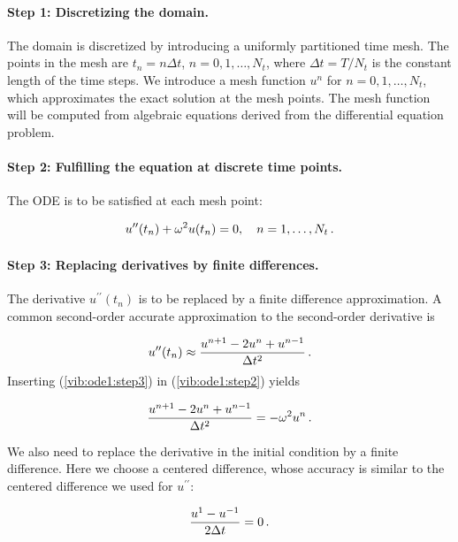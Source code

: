 \documentclass[%
oneside,                 %
final,                   %
10pt]{article}
\begin{document}
\paragraph{Step 1: Discretizing the domain.}
The domain is discretized by
introducing a uniformly partitioned time mesh.
The points in the mesh are $t_n=n\Delta t$, $n=0,1,\ldots,N_t$,
where $\Delta t = T/N_t$ is the constant length of the time steps.
We introduce a mesh function $u^n$ for $n=0,1,\ldots,N_t$, which
approximates the exact solution at the mesh points. The mesh
function will be computed from algebraic equations derived from
the differential equation problem.


\paragraph{Step 2: Fulfilling the equation at discrete time points.}
The ODE is to be satisfied at each mesh point:

\begin{equation}
u^{\prime\prime}(t_n) + \omega^2u(t_n) = 0,\quad n=1,\ldots,N_t
\tp
\label{vib:ode1:step2}
\end{equation}

 

\paragraph{Step 3: Replacing derivatives by finite differences.}
The derivative $u^{\prime\prime}(t_n)$ is to be replaced by a finite
difference approximation. A common second-order accurate approximation
to the second-order derivative is

\begin{equation}
u^{\prime\prime}(t_n) \approx \frac{u^{n+1}-2u^n + u^{n-1}}{\Delta t^2}
\tp
\label{vib:ode1:step3}
\end{equation}
Inserting (\ref{vib:ode1:step3}) in (\ref{vib:ode1:step2})
yields

\begin{equation}
\frac{u^{n+1}-2u^n + u^{n-1}}{\Delta t^2} = -\omega^2 u^n
\tp
\label{vib:ode1:step3b}
\end{equation}

We also need to replace the derivative in the initial condition by
a finite difference. Here we choose a centered difference, whose
accuracy is similar to the centered difference we used for $u^{\prime\prime}$:

\begin{equation}
\frac{u^1-u^{-1}}{2\Delta t} = 0
\label{vib:ode1:step3c}
\tp
\end{equation}
\end{document}
